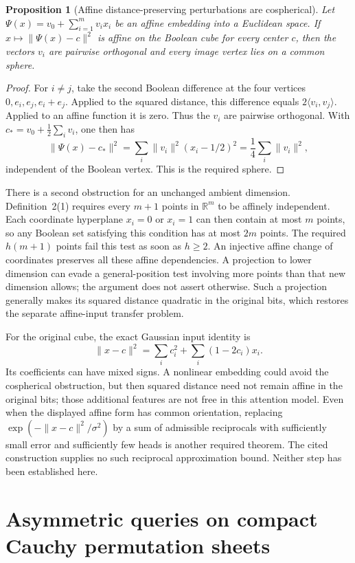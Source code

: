 \documentclass[11pt]{article}
\newtheorem{proposition}{Proposition}
\begin{document}
\begin{proposition}[Affine distance-preserving perturbations are cospherical]
Let $\Psi(x)=v_0+\sum_{i=1}^m v_i x_i$ be an affine embedding into a
Euclidean space. If $x\mapsto\|\Psi(x)-c\|^2$ is affine on the
Boolean cube for every center $c$, then the vectors $v_i$ are
pairwise orthogonal and every image vertex lies on a common sphere.
\end{proposition}
\begin{proof}
For $i\ne j$, take the second Boolean difference at the four
vertices $0,e_i,e_j,e_i+e_j$. Applied to the squared distance, this
difference equals $2\langle v_i,v_j\rangle$. Applied to an affine
function it is zero. Thus the $v_i$ are pairwise orthogonal. With
$c_\ast=v_0+\frac12\sum_i v_i$, one then has
\[
 \|\Psi(x)-c_\ast\|^2
 =\sum_i\|v_i\|^2(x_i-1/2)^2
 =\frac14\sum_i\|v_i\|^2,
\]
independent of the Boolean vertex. This is the required sphere.
\end{proof}

There is a second obstruction for an unchanged ambient dimension.
Definition~2(1) requires every $m+1$ points in $\mathbb R^m$ to be
affinely independent. Each coordinate hyperplane $x_i=0$ or $x_i=1$
can then contain at most $m$ points, so any Boolean set satisfying
this condition has at most $2m$ points. The required $h(m+1)$
points fail this test as soon as $h\ge2$. An injective affine change
of coordinates preserves all these affine dependencies. A
projection to lower dimension can evade a general-position test
involving more points than that new dimension allows; the argument
does not assert otherwise. Such a projection generally makes its
squared distance quadratic in the original bits, which restores the
separate affine-input transfer problem.

For the original cube, the exact Gaussian input identity is
\[
 \|x-c\|^2=\sum_i c_i^2+\sum_i(1-2c_i)x_i.
\]
Its coefficients can have mixed signs. A nonlinear embedding could
avoid the cospherical obstruction, but then squared distance need
not remain affine in the original bits; those additional features
are not free in this attention model. Even when the displayed
affine form has common orientation, replacing
$\exp(-\|x-c\|^2/\sigma^2)$ by a sum of admissible reciprocals with
sufficiently small error and sufficiently few heads is another
required theorem. The cited construction supplies no such
reciprocal approximation bound. Neither step has been established
here.

\section{Asymmetric queries on compact Cauchy permutation sheets}
\end{document}
